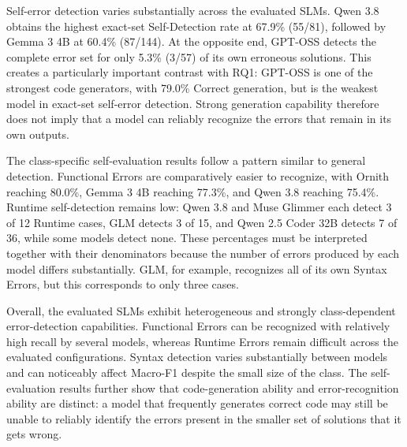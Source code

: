 Self-error detection varies substantially across the evaluated SLMs. Qwen 3.8 obtains the highest exact-set Self-Detection rate at 67.9\% (55/81), followed by Gemma 3 4B at 60.4\% (87/144). At the opposite end, GPT-OSS detects the complete error set for only 5.3\% (3/57) of its own erroneous solutions. This creates a particularly important contrast with RQ1: GPT-OSS is one of the strongest code generators, with 79.0\% Correct generation, but is the weakest model in exact-set self-error detection. Strong generation capability therefore does not imply that a model can reliably recognize the errors that remain in its own outputs.

The class-specific self-evaluation results follow a pattern similar to general detection. Functional Errors are comparatively easier to recognize, with Ornith reaching 80.0\%, Gemma 3 4B reaching 77.3\%, and Qwen 3.8 reaching 75.4\%. Runtime self-detection remains low: Qwen 3.8 and Muse Glimmer each detect 3 of 12 Runtime cases, GLM detects 3 of 15, and Qwen 2.5 Coder 32B detects 7 of 36, while some models detect none. These percentages must be interpreted together with their denominators because the number of errors produced by each model differs substantially. GLM, for example, recognizes all of its own Syntax Errors, but this corresponds to only three cases.

Overall, the evaluated SLMs exhibit heterogeneous and strongly class-dependent error-detection capabilities. Functional Errors can be recognized with relatively high recall by several models, whereas Runtime Errors remain difficult across the evaluated configurations. Syntax detection varies substantially between models and can noticeably affect Macro-F1 despite the small size of the class. The self-evaluation results further show that code-generation ability and error-recognition ability are distinct: a model that frequently generates correct code may still be unable to reliably identify the errors present in the smaller set of solutions that it gets wrong.